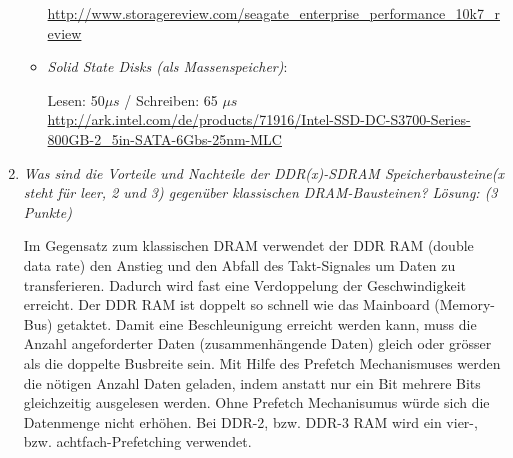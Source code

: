 \documentclass[10pt]{article}
\begin{document}
\begin{enumerate}[label=\alph*)]
\begin{itemize}
			\url{http://www.storagereview.com/seagate_enterprise_performance_10k7_review}
			
			
			\item \textit{Solid State Disks (als Massenspeicher)}:
			
			Lesen: 50$\mu s$ / Schreiben: 65 $\mu s$ \\
			
			\url{http://ark.intel.com/de/products/71916/Intel-SSD-DC-S3700-Series-800GB-2_5in-SATA-6Gbs-25nm-MLC}
		\end{itemize}
		\item 
			\textit{Was sind die Vorteile und Nachteile der DDR(x)-SDRAM Speicherbausteine(x steht für leer, 2 und 3) gegenüber klassischen DRAM-Bausteinen? Lösung: (3 Punkte)}
		
		Im Gegensatz zum klassischen DRAM verwendet der DDR RAM (double data rate) den Anstieg und den Abfall des Takt-Signales um Daten zu transferieren. Dadurch wird fast eine Verdoppelung der Geschwindigkeit erreicht. Der DDR RAM ist doppelt so schnell wie das Mainboard (Memory-Bus) getaktet. Damit eine Beschleunigung erreicht werden kann, muss die Anzahl angeforderter Daten (zusammenhängende Daten) gleich oder grösser als die doppelte Busbreite sein. 
		Mit Hilfe des Prefetch Mechanismuses werden die nötigen Anzahl Daten geladen, indem anstatt nur ein Bit mehrere Bits gleichzeitig ausgelesen werden. Ohne Prefetch Mechanisumus würde sich die Datenmenge nicht erhöhen. Bei DDR-2, bzw. DDR-3 RAM wird ein vier-, bzw. achtfach-Prefetching verwendet. 

		
\end{enumerate}
\end{document}
